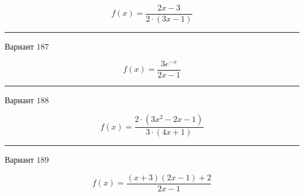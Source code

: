 \documentclass[11pt]{report}
\begin{document}
$$f(x) = \frac{2 x - 3}{2 \cdot \left(3 x - 1\right)}$$
\begin{center}
\noindent\rule{8cm}{0.4pt}
\end{center}
Вариант $187$


$$f(x) = \frac{3 e^{- x}}{2 x - 1}$$
\begin{center}
\noindent\rule{8cm}{0.4pt}
\end{center}
Вариант $188$


$$f(x) = \frac{2 \cdot \left(3 x^{2} - 2 x - 1\right)}{3 \cdot \left(4 x + 1\right)}$$
\begin{center}
\noindent\rule{8cm}{0.4pt}
\end{center}
Вариант $189$


$$f(x) = \frac{\left(x + 3\right) \left(2 x - 1\right) + 2}{2 x - 1}$$
\end{document}
